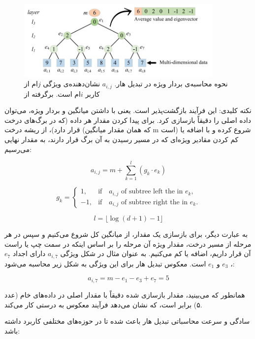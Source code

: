 \begin{figure}[h]
  \centering
  \includegraphics[width=0.9\textwidth]{figs/haar_tree.jpg}
  \caption{نحوه‌ محاسبه‌ی بردار ویژه در تبدیل هار. $a_{i,j}$ نشان‌دهنده‌ی ویژگی $j$ام از کاربر $i$ام است. برگرفته از }
  \label{fig:haar_tree}
\end{figure}

نکته کلیدی: این فرآیند بازگشت‌پذیر است. یعنی با داشتن میانگین و بردار ویژه، می‌توان داده اصلی را دقیقاً بازسازی کرد. برای پیدا کردن مقدار هر داده (که در برگ‌های درخت قرار دارد)، از ریشه درخت (که همان مقدار میانگین m است) شروع کرده و با اضافه یا کم کردن مقادیر ویژه‌ای که در مسیر رسیدن به آن برگ قرار دارند، به مقدار نهایی می‌رسیم:

\begin{equation}
a_{i,j} = m + \sum_{k=1}^{l} (g_k \cdot e_k)
\label{equ:inverse_haar}
\end{equation}

$$g_k =
\begin{cases} 
1, & \text{if} \quad a_{i,j} \text{ of subtree left the in } e_k, \\[10pt]
-1, & \text{if} \quad a_{i,j} \text{ of subtree right the in } e_k.
\end{cases}$$

$$l = \lfloor \log(d+1) - 1 \rfloor$$

به عبارت دیگر، برای بازسازی یک مقدار، از میانگین کل شروع می‌کنیم و سپس در هر مرحله از مسیر درخت، مقدار ویژه آن مرحله را بر اساس اینکه در سمت چپ یا راست آن قرار داریم، اضافه یا کم می‌کنیم. به عنوان مثال در شکل  ویژگی $a_{i,7}$ دارای اجداد $e_7$، $e_3$ و $e_1$ است. معکوس تبدیل هار برای این ویژگی به شکل زیر محاسبه می‌شود:

$$a_{i,7} = m - e_1 - e_3 + e_7 = 5$$


همانطور که می‌بینید، مقدار بازسازی شده دقیقاً با مقدار اصلی در داده‌های خام (عدد ۵) برابر است، که نشان می‌دهد فرآیند معکوس به درستی کار می‌کند.

سادگی و سرعت محاسباتی تبدیل هار باعث شده تا در حوزه‌های مختلفی کاربرد داشته باشد:


